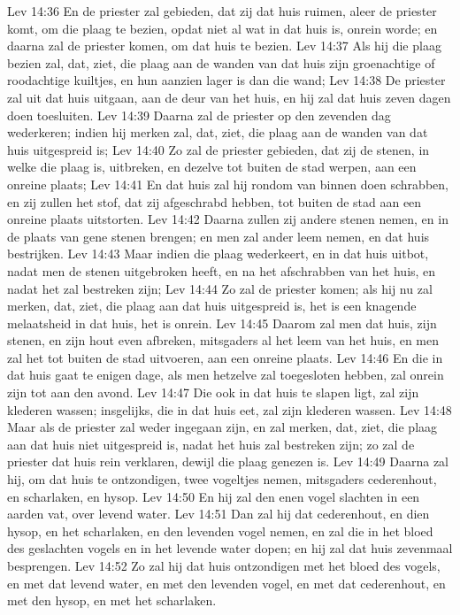 Lev 14:36  En de priester zal gebieden, dat zij dat huis ruimen, aleer de priester komt, om die plaag te bezien, opdat niet al wat in dat huis is, onrein worde; en daarna zal de priester komen, om dat huis te bezien.
Lev 14:37  Als hij die plaag bezien zal, dat, ziet, die plaag aan de wanden van dat huis zijn groenachtige of roodachtige kuiltjes, en hun aanzien lager is dan die wand;
Lev 14:38  De priester zal uit dat huis uitgaan, aan de deur van het huis, en hij zal dat huis zeven dagen doen toesluiten.
Lev 14:39  Daarna zal de priester op den zevenden dag wederkeren; indien hij merken zal, dat, ziet, die plaag aan de wanden van dat huis uitgespreid is;
Lev 14:40  Zo zal de priester gebieden, dat zij de stenen, in welke die plaag is, uitbreken, en dezelve tot buiten de stad werpen, aan een onreine plaats;
Lev 14:41  En dat huis zal hij rondom van binnen doen schrabben, en zij zullen het stof, dat zij afgeschrabd hebben, tot buiten de stad aan een onreine plaats uitstorten.
Lev 14:42  Daarna zullen zij andere stenen nemen, en in de plaats van gene stenen brengen; en men zal ander leem nemen, en dat huis bestrijken.
Lev 14:43  Maar indien die plaag wederkeert, en in dat huis uitbot, nadat men de stenen uitgebroken heeft, en na het afschrabben van het huis, en nadat het zal bestreken zijn;
Lev 14:44  Zo zal de priester komen; als hij nu zal merken, dat, ziet, die plaag aan dat huis uitgespreid is, het is een knagende melaatsheid in dat huis, het is onrein.
Lev 14:45  Daarom zal men dat huis, zijn stenen, en zijn hout even afbreken, mitsgaders al het leem van het huis, en men zal het tot buiten de stad uitvoeren, aan een onreine plaats.
Lev 14:46  En die in dat huis gaat te enigen dage, als men hetzelve zal toegesloten hebben, zal onrein zijn tot aan den avond.
Lev 14:47  Die ook in dat huis te slapen ligt, zal zijn klederen wassen; insgelijks, die in dat huis eet, zal zijn klederen wassen.
Lev 14:48  Maar als de priester zal weder ingegaan zijn, en zal merken, dat, ziet, die plaag aan dat huis niet uitgespreid is, nadat het huis zal bestreken zijn; zo zal de priester dat huis rein verklaren, dewijl die plaag genezen is.
Lev 14:49  Daarna zal hij, om dat huis te ontzondigen, twee vogeltjes nemen, mitsgaders cederenhout, en scharlaken, en hysop.
Lev 14:50  En hij zal den enen vogel slachten in een aarden vat, over levend water.
Lev 14:51  Dan zal hij dat cederenhout, en dien hysop, en het scharlaken, en den levenden vogel nemen, en zal die in het bloed des geslachten vogels en in het levende water dopen; en hij zal dat huis zevenmaal besprengen.
Lev 14:52  Zo zal hij dat huis ontzondigen met het bloed des vogels, en met dat levend water, en met den levenden vogel, en met dat cederenhout, en met den hysop, en met het scharlaken.

